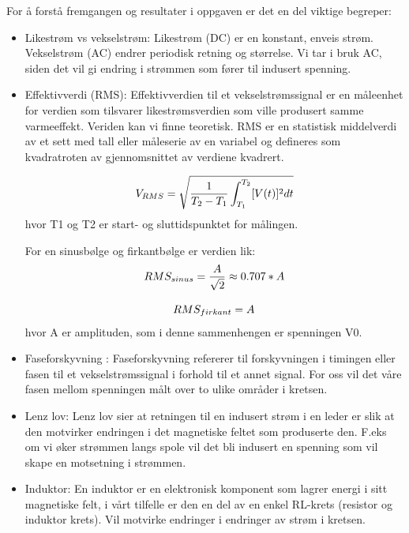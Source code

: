 \documentclass[norsk,a4paper,12pt]{article}
\begin{document}
For å forstå fremgangen og resultater i oppgaven er det en del viktige begreper:

\begin{itemize} 
\item Likestrøm vs vekselstrøm: Likestrøm (DC) er en konstant, enveis strøm. Vekselstrøm (AC) endrer periodisk retning og størrelse. Vi tar i bruk AC, siden det vil gi endring i strømmen som fører til indusert spenning.
\item Effektivverdi (RMS): Effektivverdien til et vekselstrømssignal er en måleenhet for verdien som tilsvarer likestrømsverdien som ville produsert samme varmeeffekt. Veriden kan vi finne teoretisk. RMS er en statistisk middelverdi av et sett med tall eller måleserie av en variabel og defineres som kvadratroten av gjennomsnittet av verdiene kvadrert.

\begin{equation}
V_{RMS}=\sqrt{\frac1{T_{2}-T_{1}}\int_{T_{1}}^{T_{2}}[V(t)]^{2}dt}\\
\label{eq: RMS vekselstrøm}
\end{equation}
hvor T1 og T2 er start- og sluttidspunktet for målingen.

For en sinusbølge og firkantbølge er verdien lik:
\begin{equation}
RMS_{sinus}=\frac{A}{\sqrt{2}} \approx 0.707*A \\
\label{eq: RMSsin}
\end{equation}


\begin{equation}
RMS_{firkant}= {A} \\
\label{eq: RMSsq}
\end{equation}
hvor A er amplituden, som i denne sammenhengen er spenningen V0.

\item Faseforskyvning : Faseforskyvning refererer til forskyvningen i timingen eller fasen til et vekselstrømssignal i forhold til et annet signal. For oss vil det våre fasen mellom spenningen målt over to ulike områder i kretsen. 

\item Lenz lov: Lenz lov sier at retningen til en indusert strøm i en leder er slik at den motvirker endringen i det magnetiske feltet som produserte den. F.eks om vi øker strømmen langs spole vil det bli indusert en spenning som vil skape en motsetning i strømmen.

\item Induktor: En induktor er en elektronisk komponent som lagrer energi i sitt magnetiske felt, i vårt tilfelle er den en del av en enkel RL-krets (resistor og induktor krets). Vil motvirke endringer i endringer av strøm i kretsen.


\end{itemize}
\end{document}
